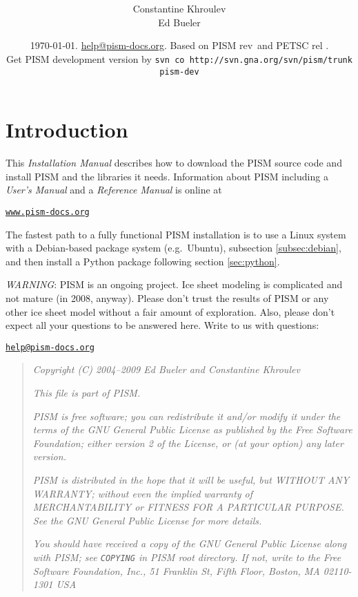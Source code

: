 \documentclass[11pt,final]{amsart}
\title[PISM Installation Manual]{\protect{\Large \emph{PISM}, a Parallel Ice
    Sheet Model:\normalsize} \\ \protect{\Large \bigskip \bigskip Installation
    Manual\normalsize}}
\author[]{Constantine Khroulev \\ Ed Bueler}
\date{\today. \href{mailto:help@pism-docs.org}{help@pism-docs.org}. Based on
  PISM rev \PISMREV\,and PETSC rel \PETSCREL. \\ Get PISM development version
  by \quad\texttt{svn co http://svn.gna.org/svn/pism/trunk pism-dev}\quad}
\renewcommand{\t}[1]{\texttt{#1}}
\begin{document}
\maketitle
\thispagestyle{empty}

\vspace{1.5in}
\setcounter{tocdepth}{2}
\tableofcontents



\newpage
\section*{Introduction}

\large
This \emph{Installation Manual} describes how to download the PISM source code and install PISM and the libraries it needs.  Information about PISM including a \emph{User's Manual} and a \emph{Reference Manual} is online at
\bigskip
\begin{center}
  \href{http://www.pism-docs.org}{\t{www.pism-docs.org}}
\end{center}
\bigskip
\noindent The fastest path to a fully functional PISM installation is to use a Linux system with a Debian-based package system (e.g.~Ubuntu), subsection \ref{subsec:debian}, and then install a Python package following section \ref{sec:python}.
\vfill

\noindent\emph{WARNING}:  PISM is an ongoing project.  Ice sheet modeling is complicated and not mature (in 2008, anyway).  Please don't trust the results of PISM or any other ice sheet model without a fair amount of exploration.  Also, please don't expect all your questions to be answered here.  Write to us with questions: \bigskip

\centerline{\href{mailto:help@pism-docs.org}{\texttt{help@pism-docs.org}}}
\vfill

\begin{quote}
\textsl{Copyright (C) 2004--2009 Ed Bueler and Constantine Khroulev}
\medskip

\noindent \textsl{This file is part of PISM.}
\medskip

\noindent \textsl{PISM is free software; you can redistribute it and/or modify it under the terms of the GNU General Public
  License as published by the Free Software Foundation; either version 2 of the License, or (at your option) any later version.}
\medskip

\noindent \textsl{PISM is distributed in the hope that it will be useful, but WITHOUT ANY WARRANTY; without even the implied
  warranty of MERCHANTABILITY or FITNESS FOR A PARTICULAR PURPOSE. See the GNU General Public License for more details.} \medskip

\noindent \textsl{You should have received a copy of the GNU General Public License along
  with PISM; see \emph{\texttt{COPYING}} in PISM root directory. If not, write to the Free Software Foundation, Inc., 51 Franklin
  St, Fifth Floor, Boston, MA 02110-1301 USA}
\end{quote}
\end{document}
